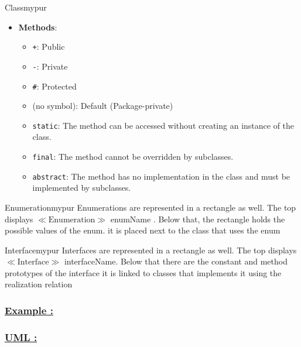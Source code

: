 \begin{prettyBox}{Class}{mypur}
\begin{itemize}
\begin{itemize}
\begin{itemize}
            \end{itemize}
            \item \textbf{Methods}: 
            \begin{itemize}
                \item \texttt{+}: Public
                \item \texttt{-}: Private
                \item \texttt{\#}: Protected
                \item (no symbol): Default (Package-private)
                \item \texttt{static}: The method can be accessed without creating an instance of the class.
                \item \texttt{final}: The method cannot be overridden by subclasses.
                \item \texttt{abstract}: The method has no implementation in the class and must be implemented by subclasses.
            \end{itemize}
        \end{itemize}
\end{itemize}
\end{prettyBox}
\vspace{0.15cm}


\begin{prettyBox}{Enumeration}{mypur}
Enumerations are represented in a rectangle as well. The top displays \(\ll\text{Enumeration}\gg\)
 enumName . Below that, the rectangle holds the possible values of the enum.
it is placed next to the class that uses the enum
\end{prettyBox}


\vspace{0.15cm}
\begin{prettyBox}{Interface}{mypur}
Interfaces are represented in a rectangle as well. The top displays \(\ll\text{Interface}\gg\) interfaceName. Below that
there are the constant and method prototypes of the interface
it is linked to classes that implements it using the realization relation
\end{prettyBox}

\vspace{0.15cm}
\subsubsection*{\underline{Example :}}

\subsubsection*{\underline{UML :}}

